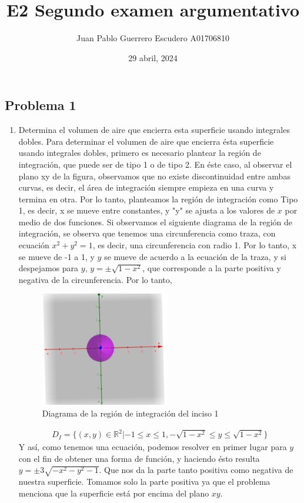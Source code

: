 \documentclass[12pt, letterpaper]{report}
\title{E2 Segundo examen argumentativo}
\author{Juan Pablo Guerrero Escudero A01706810}
\date{29 abril, 2024}
\begin{document}
\maketitle
\subsection*{Problema 1}
\begin{enumerate}
\item Determina el volumen de aire que encierra esta superficie usando integrales dobles. 
Para determinar el volumen de aire que encierra ésta superficie usando integrales dobles, primero es necesario plantear la región de integración, 
que puede ser de tipo 1 o de tipo 2. En éste caso, al observar el plano xy de la figura, observamos que no existe discontinuidad 
entre ambas curvas, es decir, el área de integración siempre empieza en una curva y termina en otra. Por lo tanto, planteamos la 
región de integración como Tipo 1, es decir, x se mueve entre constantes, y "y" se ajusta a los valores de $x$ 
por medio de dos funciones. Si observamos el siguiente diagrama de la región de integración, se observa que tenemos una circunferencia como traza, con ecuación $x^2 + y^2 = 1$, es decir, 
una circunferencia con radio 1. Por lo tanto, x se mueve de -1 a 1, y $y$ se mueve de acuerdo a la ecuación de la traza, y si despejamos para $y$, $y = \pm \sqrt{1-x^2}$, que 
corresponde a la parte positiva y negativa de la circunferencia. Por lo tanto, 
\begin{figure}[H]
    \centering
    \includegraphics[height = 5cm]{Diagrama 1.png}
    \caption{Diagrama de la región de integración del inciso 1}
\end{figure}
\begin{align}
D_I = \{ (x, y) \in \mathbb{R}^2 | -1\leq x \leq 1, -\sqrt{1-x^2} \leq y \leq \sqrt{1-x^2}\} 
\end{align}
Y así, como tenemos una ecuación, podemos resolver en primer lugar para $y$ con el fin de obtener 
una forma de función, y haciendo ésto resulta $y = \pm 3\sqrt{-x^2 -y^2 -1}$. Que nos da la parte 
tanto positiva como negativa de nuestra superficie. Tomamos solo la parte positiva ya que el problema menciona que la 
superficie está por encima del plano $xy$. \\ 


\end{enumerate}
\end{document}
